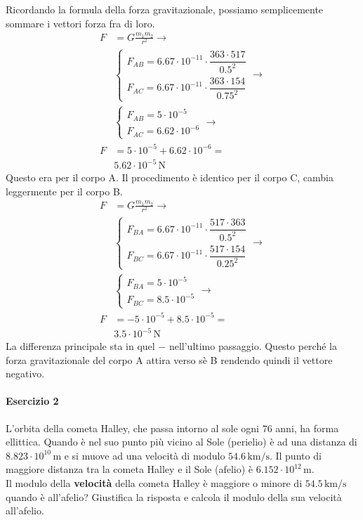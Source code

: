 Ricordando la formula della forza gravitazionale, possiamo semplicemente sommare i vettori forza fra
di loro.
\begin{align*}
F &= G\frac{m_1m_2}{r^2} \rightarrow \\
&\begin{cases*}
F_{AB}  = 6.67\cdot10^{-11}\cdot\dfrac{363\cdot517}{0.5^2}\\
F_{AC}  = 6.67\cdot10^{-11}\cdot\dfrac{363\cdot154}{0.75^2}
\end{cases*} \rightarrow\\
&\begin{cases*}
F_{AB}  = 5\cdot10^{-5}\\
F_{AC}  = 6.62\cdot10^{-6}
\end{cases*} \rightarrow\\
F &= 5\cdot10^{-5}+6.62\cdot10^{-6} = \\&
\boxed{5.62\cdot10^{-5}\,\text{N}}
\end{align*}
Questo era per il corpo A. Il procedimento è identico per il corpo C, cambia leggermente per il 
corpo B.
\begin{align*}
F &= G\frac{m_1m_2}{r^2} \rightarrow\\
&\begin{cases*}
F_{BA} = 6.67\cdot10^{-11}\cdot\dfrac{517\cdot363}{0.5^2}\\
F_{BC} = 6.67\cdot10^{-11}\cdot\dfrac{517\cdot154}{0.25^2}
\end{cases*} \rightarrow\\
&\begin{cases*}
F_{BA}  = 5\cdot10^{-5}\\
F_{BC}  = 8.5\cdot10^{-5}
\end{cases*} \rightarrow\\
F &= -5\cdot10^{-5}+8.5\cdot10^{-5} = \\
&\boxed{3.5\cdot10^{-5}\,\text{N}}
\end{align*}
La differenza principale sta in quel $-$ nell'ultimo passaggio. Questo perché la forza 
gravitazionale del corpo A attira verso sè B rendendo quindi il vettore negativo.

\paragraph{Esercizio 2}
L'orbita della cometa Halley, che passa intorno al sole ogni $76$ anni, ha forma ellittica. Quando
è nel suo punto più vicino al Sole (perielio) è ad una distanza di $8.823\cdot10^{10}\,\text{m}$ e si
muove ad una velocità di modulo $54.6\,\text{km/s}$. Il punto di maggiore distanza tra la cometa 
Halley e il Sole (afelio) è $6.152\cdot10^{12}\,\text{m}$.\\
Il modulo della \textbf{velocità} della cometa Halley è maggiore o minore di $54.5\,\text{km/s}$ 
quando è all'afelio? Giustifica la risposta e calcola il modulo della sua velocità all'afelio.
\divisor

